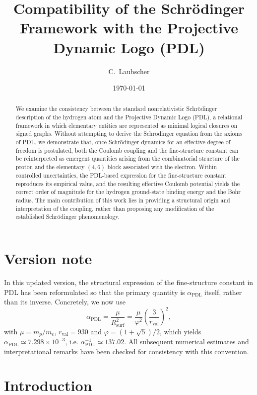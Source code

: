 \documentclass[12pt,a4paper]{article}
\title{Compatibility of the Schr\"odinger Framework with the Projective Dynamic Logo (PDL)}
\author{C.~Laubscher}
\date{\today}
\begin{document}
\maketitle

\begin{abstract}
We examine the consistency between the standard nonrelativistic Schr\"odinger description of the hydrogen atom and the Projective Dynamic Logo (PDL), a relational framework in which elementary entities are represented as minimal logical closures on signed graphs. Without attempting to derive the Schr\"odinger equation from the axioms of PDL, we demonstrate that, once Schr\"odinger dynamics for an effective degree of freedom is postulated, both the Coulomb coupling and the fine-structure constant can be reinterpreted as emergent quantities arising from the combinatorial structure of the proton and the elementary $(4,6)$ block associated with the electron. Within controlled uncertainties, the PDL-based expression for the fine-structure constant reproduces its empirical value, and the resulting effective Coulomb potential yields the correct order of magnitude for the hydrogen ground-state binding energy and the Bohr radius. The main contribution of this work lies in providing a structural origin and interpretation of the coupling, rather than proposing any modification of the established Schr\"odinger phenomenology.
\end{abstract}

\section*{Version note}

In this updated version, the structural expression of the fine-structure constant in PDL has been reformulated so that the primary quantity is \(\alpha_{\text{PDL}}\) itself, rather than
its inverse. Concretely, we now use
\[
  \alpha_{\text{PDL}}
  = \frac{\mu}{R_{\text{surf}}^2}
  = \frac{\mu}{\varphi^2}\left(\frac{3}{r_{\text{val}}}\right)^2,
\]
with \(\mu = m_p/m_e\), \(r_{\text{val}} = 930\) and \(\varphi = (1+\sqrt{5})/2\), which yields
\(\alpha_{\text{PDL}} \simeq 7.298\times 10^{-3}\), i.e. \(\alpha_{\text{PDL}}^{-1} \simeq 137.02\).
All subsequent numerical estimates and interpretational remarks have been checked for consistency with this convention.

\section{Introduction}
\end{document}
